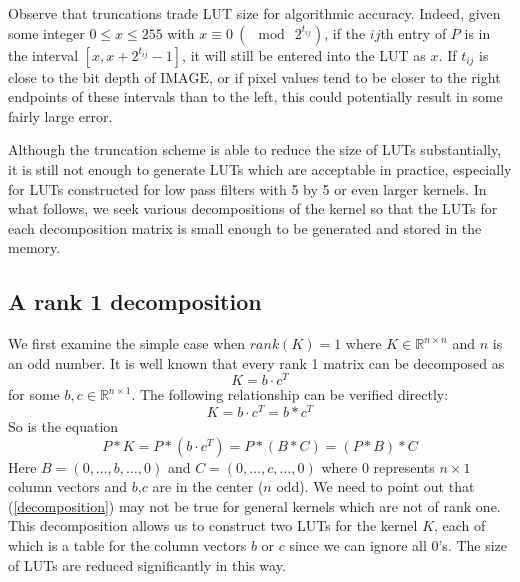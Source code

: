 \documentclass[12pt]{amsart}
\theoremstyle{definition}
\theoremstyle{remark}
\numberwithin{thm}{section}
\begin{document}
Observe that truncations trade LUT size for algorithmic accuracy. Indeed, given some integer $0\le x\le 255$ with $x \equiv 0\ (\!\!\!\mod\ 2^{t_{ij}})$, if the $ij$th entry of $P$ is in the interval $[x,x+2^{t_{ij}}-1]$, it will still be entered into the LUT as $x$. If $t_{ij}$ is close to the bit depth of $\text{IMAGE}$, or if pixel values tend to be closer to the right endpoints of these intervals than to the left, this could potentially result in some fairly large error. 

Although the truncation scheme is able to reduce the size of LUTs substantially, it is still not enough to generate LUTs which are acceptable in practice, especially for LUTs constructed for low pass filters with 5 by 5 or even larger kernels. In what follows, we seek various decompositions of the kernel so that the LUTs for each decomposition matrix is small enough to be generated and stored in the memory. 

\subsection{A rank 1 decomposition}\label{rank 1 decomposition}

We first examine the simple case when $rank(K)=1$ where $K\in \mathbb{R}^{n\times n}$ and $n$ is an odd number. It is well known that every rank 1 matrix can be decomposed as
\[K=b\cdot c^T\]
for some $b,c\in \mathbb{R}^{n\times 1}$. The following relationship can be verified directly: 
\[K=b\cdot c^T=b*c^T\]
So is the equation
\begin{equation}\label{decomposition}
P*K=P*(b\cdot c^T)=P*(B*C)=(P*B)*C
\end{equation}
Here $B=(0,\dots,b,\dots,0)$ and $C=(0,\dots,c,\dots,0)$ where $0$ represents $n\times 1$ column vectors and $b$,$c$ are in the center ($n$ odd). We need to point out that (\ref{decomposition}) may not be true for general kernels which are not of rank one. This decomposition allows us to construct two LUTs for the kernel $K$, each of which is a table for the column vectors $b$ or $c$ since we can ignore all $0$'s. The size of LUTs are reduced significantly in this way.
\end{document}
